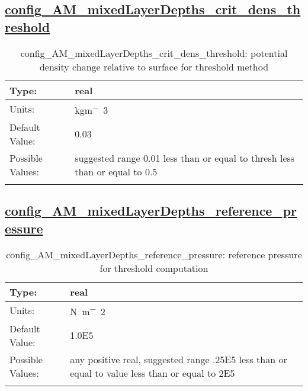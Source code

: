 \subsection[config\_AM\_mixedLayerDepths\_crit\_dens\_threshold]{\hyperref[sec:nm_tab_AM_mixedLayerDepths]{config\_AM\_mixedLayerDepths\_crit\_dens\_threshold}}
\label{subsec:nm_sec_config_AM_mixedLayerDepths_crit_dens_threshold}
\begin{center}
\begin{longtable}{| p{2.0in} || p{4.0in} |}
    \hline
    Type: & real \\
    \hline
    Units: & \si{kgm^-3} \\
    \hline
    Default Value: & 0.03 \\
    \hline
    Possible Values: & suggested range 0.01 less than or equal to thresh less than or equal to 0.5 \\
    \hline
    \caption{config\_AM\_mixedLayerDepths\_crit\_dens\_threshold: potential density change relative to surface for threshold method}
\end{longtable}
\end{center}
\subsection[config\_AM\_mixedLayerDepths\_reference\_pressure]{\hyperref[sec:nm_tab_AM_mixedLayerDepths]{config\_AM\_mixedLayerDepths\_reference\_pressure}}
\label{subsec:nm_sec_config_AM_mixedLayerDepths_reference_pressure}
\begin{center}
\begin{longtable}{| p{2.0in} || p{4.0in} |}
    \hline
    Type: & real \\
    \hline
    Units: & \si{N.m^-2} \\
    \hline
    Default Value: & 1.0E5 \\
    \hline
    Possible Values: & any positive real, suggested range .25E5 less than or equal to value less than or equal to 2E5 \\
    \hline
    \caption{config\_AM\_mixedLayerDepths\_reference\_pressure: reference pressure for threshold computation}
\end{longtable}
\end{center}
